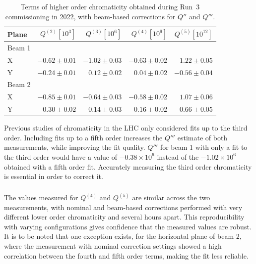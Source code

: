 \begin{table}[!htb]
    \centering
    \begin{tabular}{lrrrr}
      \toprule
       Plane          & $Q^{(2)} [10^3]$ & $Q^{(3)} [10^6]$ & $Q^{(4)} [10^9]$ & $Q^{(5)} [10^{12}]$ \\
      \midrule
        Beam 1    &           &          &              &              \\
        \hspace{2mm}X         & $-0.62 \pm 0.01$     & $-1.02 \pm 0.03$ & $-0.63 \pm 0.02$ &$  1.22 \pm 0.05$ \\
        \hspace{2mm}Y         & $-0.24 \pm 0.01$     & $0.12 \pm 0.02 $&  $0.04 \pm 0.02 $& $-0.56 \pm 0.04 $\\
        Beam 2    &           &&&     \\
        \hspace{2mm}X         & $-0.85 \pm 0.01$     & $-0.64 \pm 0.03$ & $-0.58 \pm 0.02$ &$  1.07 \pm 0.06$ \\
        \hspace{2mm}Y         & $-0.30 \pm 0.02$     & $0.14 \pm 0.03 $&  $0.16 \pm 0.02 $& $-0.66 \pm 0.05 $\\
      \bottomrule
    \end{tabular}
    \caption{Terms of higher order chromaticity obtained during Run~3 commissioning in 2022,
    with beam-based corrections for $Q''$ and $Q'''$.}
    \label{tab:high_orders:chroma_table_after}
\end{table}


Previous studies of chromaticity in the LHC only considered fits up to the third order.
Including fits up to a fifth order increases the $Q'''$ estimate of both measurements, while 
improving the fit quality. $Q'''$ for beam 1 with only a fit to the third order would have a value
of $-0.38 \times 10^6$ instead of the $-1.02 \times 10^6$ obtained with a fifth order fit. 
Accurately measuring the third order chromaticity is essential in order to correct it.

\subsubsection{}
\label{subsection:q4q5_quality}

The values measured for $Q^{(4)}$ and $Q^{(5)}$ are similar across the two measurements, with
nominal and beam-based corrections performed with very different lower order chromaticity and
several hours apart.  
This reproducibility with varying configurations gives confidence that the measured values are
robust. It is to be noted that one exception exists, for the horizontal plane of beam 2, where the
measurement with nominal correction settings showed a high correlation between the fourth and fifth
order terms, making the fit less reliable.

